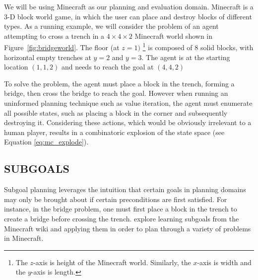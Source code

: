\documentclass[]{article}
\begin{document}
We will be using Minecraft as our planning and evaluation domain. Minecraft
is a 3-D block world game, in which the user can place and destroy blocks of
different types. As a running example, we will consider the problem of an agent
attempting to cross a trench in a $4 \times 4 \times 2$ Minecraft world shown
in Figure~\ref{fig:bridgeworld}. The floor (at $z = 1)$ \footnote{The $z$-axis
is height of the Minecraft world. Similarly, the $x$-axis is width and the
$y$-axis is length.} is composed of 8 solid blocks, with horizontal empty
trenches at $y = 2$ and $y = 3$. The agent is  at the starting location
$(1, 1, 2)$ and needs to reach the goal at $(4,4,2)$

To solve the problem, the agent must
place a block in the trench, forming a bridge, then cross the bridge
to reach the goal.  However when running an uninformed planning
technique such as value iteration, the agent must enumerate all
possible states, such as placing a block in the corner and
subsequently destroying it.  Considering these actions, which would be
obviously irrelevant to a human player, results in a combinatoric
explosion of the state space (see Equation \ref{eq:mc_explode}).



\subsection{SUBGOALS}

Subgoal planning leverages the intuition that certain goals in
planning domains may only be brought about if certain preconditions
are first satisfied. For instance, in the bridge problem, one must
first place a block in the trench to create a bridge before crossing
the trench.  \citet{branavan12a} explore learning subgoals from the
Minecraft wiki and applying them in order to plan through a variety of
problems in Minecraft.  


\end{document}
